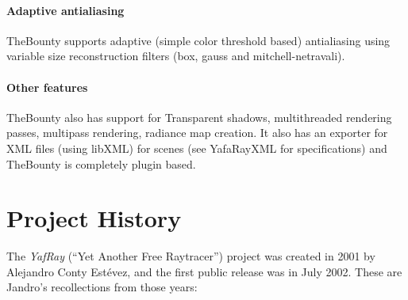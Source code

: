 \paragraph{Adaptive antialiasing} TheBounty supports adaptive (simple color threshold based) antialiasing using variable size reconstruction filters (box, gauss and mitchell-netravali).

\paragraph{Other features} TheBounty also has support for Transparent shadows, multithreaded rendering passes, multipass rendering, radiance map creation. It also has an exporter for XML files (using libXML) for scenes (see YafaRayXML for specifications) and TheBounty is completely plugin based.

\section*{Project History}
The \textit{YafRay} (``Yet Another Free Raytracer'') project was created in 2001 by Alejandro Conty Estévez, and the first public release was in July 2002. These are Jandro's recollections from those years:

